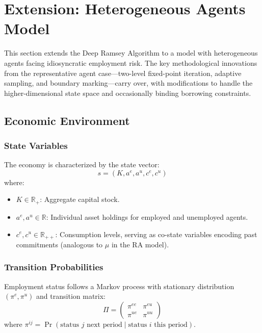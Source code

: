 \newpage
\section{Extension: Heterogeneous Agents Model}

This section extends the Deep Ramsey Algorithm to a model with heterogeneous agents facing idiosyncratic employment risk. The key methodological innovations from the representative agent case—two-level fixed-point iteration, adaptive sampling, and boundary marking—carry over, with modifications to handle the higher-dimensional state space and occasionally binding borrowing constraints.

\subsection{Economic Environment}

\subsubsection{State Variables}
The economy is characterized by the state vector:
\begin{equation}
    s = (K, a^e, a^u, c^e, c^u)
\end{equation}
where:
\begin{itemize}
    \item $K \in \mathbb{R}_+$: Aggregate capital stock.
    \item $a^e, a^u \in \mathbb{R}$: Individual asset holdings for employed and unemployed agents.
    \item $c^e, c^u \in \mathbb{R}_{++}$: Consumption levels, serving as co-state variables encoding past commitments (analogous to $\mu$ in the RA model).
\end{itemize}

\subsubsection{Transition Probabilities}
Employment status follows a Markov process with stationary distribution $(\pi^e, \pi^u)$ and transition matrix:
\begin{equation}
    \Pi = \begin{pmatrix} \pi^{ee} & \pi^{eu} \\ \pi^{ue} & \pi^{uu} \end{pmatrix}
\end{equation}
where $\pi^{ij} = \Pr(\text{status } j \text{ next period} \mid \text{status } i \text{ this period})$.

